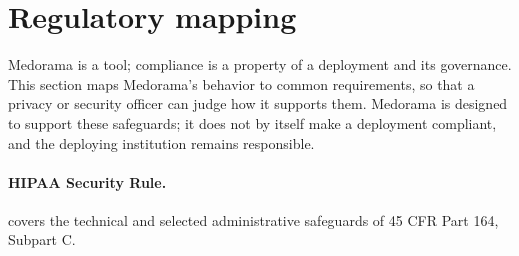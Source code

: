 \section{Regulatory mapping}
\label{sec:security-regulatory}

Medorama is a tool; compliance is a property of a deployment and its governance. This section
maps Medorama's behavior to common requirements, so that a privacy or security officer can judge
how it supports them. Medorama is designed to support these safeguards; it does not by itself
make a deployment compliant, and the deploying institution remains responsible.

\paragraph{HIPAA Security Rule.}  covers the technical and
selected administrative safeguards of 45 CFR Part 164, Subpart C.

